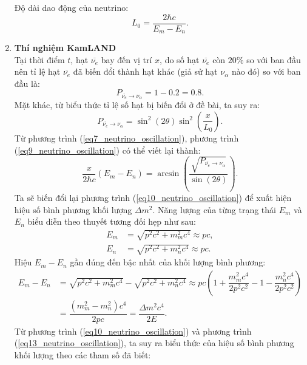 \begin{enumerate}
\begin{equation}
\end{equation}
Độ dài dao động của neutrino:
\begin{equation} \label{eq7_neutrino_oscillation}
    L_0=\dfrac{2\hbar c}{E_m-E_n}.
\end{equation}
\item \textbf{Thí nghiệm KamLAND}\\
Tại thời điểm $t$, hạt $\overline{\nu_e}$ bay đến vị trí $x$, do số hạt $\overline{\nu_e}$ còn $20\%$ so với ban đầu nên tỉ lệ hạt $\overline{\nu_e}$ đã biến đổi thành hạt khác (giả sử hạt $\nu_\alpha$ nào đó) so với ban đầu là:
\begin{equation} \label{eq8_neutrino_oscillation}
    P_{\overline{\nu_e} \rightarrow \nu_\alpha}=1-0.2=0.8.
\end{equation}
Mặt khác, từ biểu thức tỉ lệ số hạt bị biến đổi ở đề bài, ta suy ra:
\begin{equation} \label{eq9_neutrino_oscillation}
    P_{\overline{\nu_e} \rightarrow \nu_\alpha}=\sin^2(2\theta)\sin^2\left(\dfrac{x}{L_0}\right).
\end{equation}
Từ phương trình (\ref{eq7_neutrino_oscillation}), phương trình (\ref{eq9_neutrino_oscillation}) có thể viết lại thành:
\begin{equation} \label{eq10_neutrino_oscillation}
    \dfrac{x}{2\hbar c}(E_m-E_n)=\arcsin \left(\dfrac{\sqrt{P_{\overline{\nu_e} \rightarrow \nu_\alpha}}}{\sin (2\theta)}\right).
\end{equation}
Ta sẽ biến đổi lại phương trình (\ref{eq10_neutrino_oscillation}) để xuất hiện hiệu số bình phương khối lượng $\Delta m^2$. Năng lượng của từng trạng thái $E_m$ và $E_n$ biểu diễn theo thuyết tương đối hẹp như sau:
\begin{align}
    \label{eq11_neutrino_oscillation}
    E_m&=\sqrt{p^2c^2+m_m^2c^4} \approx pc, \\
    \label{eq12_neutrino_oscillation}
    E_n&=\sqrt{p^2c^2+m_n^2c^4} \approx pc. 
\end{align}
Hiệu $E_m-E_n$ gần đúng đến bậc nhất của khối lượng bình phương:
\begin{align}
    E_m-E_n&=\sqrt{p^2c^2+m_m^2c^4}-\sqrt{p^2c^2+m_n^2c^4} \approx pc\left(1+\dfrac{m_m^2c^4}{2p^2c^2}-1-\dfrac{m_n^2c^4}{2p^2c^2}\right) \nonumber \\
    \label{eq13_neutrino_oscillation}
    &= \dfrac{(m_m^2-m_n^2)c^4}{2pc} = \dfrac{\Delta m^2 c^4}{2E}.
\end{align}
    Từ phương trình (\ref{eq10_neutrino_oscillation}) và phương trình (\ref{eq13_neutrino_oscillation}), ta suy ra biểu thức của hiệu số bình phương khối lượng theo các tham số đã biết:

\end{enumerate}
